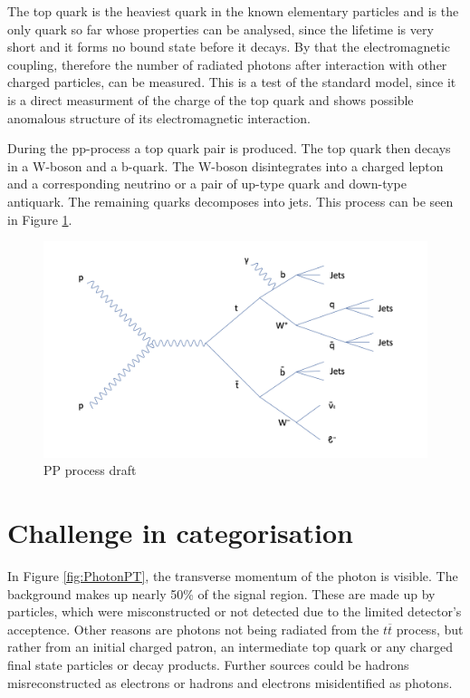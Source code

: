 \documentclass[11pt]{scrartcl}
\begin{document}
	The top quark is the heaviest quark in the known elementary particles and is the only quark so far whose properties can be analysed, since the lifetime is very short and it forms no bound state before it decays. By that the electromagnetic coupling, therefore the number of radiated photons after interaction with other charged particles, can be measured. This is a test of the standard model, since it is a direct measurment of the charge of the top quark and shows possible anomalous structure of its electromagnetic interaction.
	
	During the pp-process a top quark pair is produced. The top quark then decays in a W-boson and a b-quark. The W-boson disintegrates into a charged lepton and a corresponding neutrino or a pair of up-type quark and down-type antiquark. The remaining quarks decomposes into jets. This process can be seen in Figure \ref{fig:PPprocess}.
	
	\begin{figure}[H]
	\centering
	\includegraphics[width=1\textwidth]{figures/PP_process.png}
	\caption{PP process draft}
 	\label{fig:PPprocess}
	\end{figure}
	
\section{Challenge in categorisation}

In Figure \ref{fig:PhotonPT}, the transverse momentum of the photon is visible. The background makes up nearly 50\% of the signal region. These are made up by particles, which were misconstructed or not detected due to the limited detector's acceptence. Other reasons are photons not being radiated from the $t\overline{t}$ process, but rather from an initial charged patron, an intermediate top quark or any charged final state particles or decay products. Further sources could be hadrons misreconstructed as electrons or hadrons and electrons misidentified as photons. 
\end{document}
